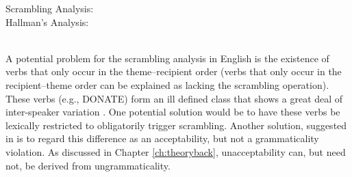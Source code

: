 \begin{exe}
\ex \label{ex:comparison-trees}
\begin{xlist}
\ex Scrambling Analysis: \\
 \ex\label{ex:hallman-tree} Hallman's Analysis: \\
\\
\end{xlist}
\end{exe}%

A potential problem for the scrambling analysis in English is the existence of verbs that only occur in the theme--recipient order (verbs that only occur in the recipient--theme order can be explained as lacking the scrambling operation). These verbs (e.g., DONATE) form an ill defined class that shows a great deal of inter-speaker variation \citep{Levin.1993}. One potential solution would be to have these verbs be lexically restricted to obligatorily trigger scrambling. Another solution, suggested in \cite{Levin.2010} is to regard this difference as an acceptability, but not a grammaticality violation. As discussed in Chapter \ref{ch:theoryback}, unacceptability can, but need not, be derived from ungrammaticality.

